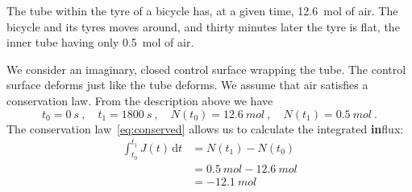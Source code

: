 \documentclass[a4paper,12pt,%
onecolumn,oneside,%
british%
]{memoir}
\newcommand*{\di}{\mathrm{d}}%
\renewcommand*{\|}[1][]{\nonscript\:#1\vert\nonscript\:\mathopen{}}
\newcommand*{\yti}{t_{0}}
\newcommand*{\ytf}{t_{1}}
\newcommand*{\dt}{\di t}
\newcommand*{\yN}{N}
\newcommand*{\yJ}{J}
\begin{document}
%
The tube within the tyre of a bicycle has, at a given time, \qty{12.6}{mol} of air.
The bicycle and its tyres moves around, and thirty minutes later the tyre is flat, the inner tube having only \qty{0.5}{mol} of air.

We consider an imaginary, closed control surface wrapping the tube. The control surface deforms just like the tube deforms. We assume that air satisfies a conservation law. From the description above we have
\begin{equation*}
  \yti=\qty{0}{s} \ ,\quad
  \ytf=\qty{1800}{s} \ ,\quad
  \yN(\yti)=\qty{12.6}{mol} \ ,\quad
  \yN(\ytf)=\qty{0.5}{mol} \ .
\end{equation*}
The conservation law~\eqref{eq:conserved} allows us to calculate the integrated \textbf{in}flux:
\begin{equation*}
  \begin{split}
    \int_{\yti}^{\ytf}\!\!\yJ(t)\,\dt &= \yN(\ytf) - \yN(\yti)
    \\&= \qty{0.5}{mol} - \qty{12.6}{mol}
    \\&= \qty{-12.1}{mol}
  \end{split}
\end{equation*}
\end{document}

